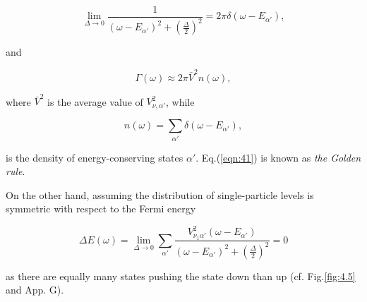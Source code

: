 \documentclass[a4paper,14pt]{book}
\begin{document}
\begin{equation}
\nonumber
\lim_{\Delta \rightarrow 0} \frac{1}{(\omega -E_{\alpha'})^2 + \left( \frac{\Delta}{2} \right)^2} = 2\pi\delta(\omega-E_{\alpha'}) ,
\end{equation}

\noindent and

\begin{equation}
\Gamma(\omega) \approx 2\pi \bar{V}^2 n(\omega) ,
\label{eqn:41}
\end{equation}

\noindent where $\bar{V}^2$ is the average value of $V_{\nu ,\alpha'}^2$, while

\begin{equation}
n(\omega) = \sum_{\alpha'} \delta(\omega - E_{\alpha'}) ,
\label{eqn:42}
\end{equation}

\noindent is the density of energy-conserving states $\alpha'$. Eq.(\ref{eqn:41}) is known as {\it the Golden rule}.

On the other hand, assuming the distribution of single-particle levels is symmetric with respect to the Fermi energy

\begin{equation}
\nonumber
\Delta E(\omega) = \lim_{\Delta \rightarrow 0} \sum_{\alpha'} \frac{V_{\nu_1 \alpha'}^2 (\omega - E_{\alpha'})}{(\omega - E_{\alpha'})^2 + \left( \frac{\Delta}{2} \right)^2} = 0
\end{equation}

\noindent as there are equally many states pushing the state down than up (cf. Fig.\ref{fig:4.5} and App. G).
\end{document}
